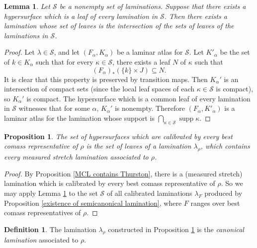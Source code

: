 \documentclass[reqno,11pt]{amsart}
\DeclareMathOperator{\supp}{supp}
\newcommand{\dfn}[1]{\emph{#1}\index{#1}}
\newtheorem{lemma}[theorem]{Lemma}
\newtheorem{proposition}[theorem]{Proposition}
\theoremstyle{definition}
\newtheorem{definition}[theorem]{Definition}
\numberwithin{equation}{section}
\begin{document}
\begin{lemma}\label{existence of intersections}
Let $\mathscr S$ be a nonempty set of laminations.
Suppose that there exists a hypersurface which is a leaf of every lamination in $\mathscr S$.
Then there exists a lamination whose set of leaves is the intersection of the sets of leaves of the laminations in $\mathscr S$.
\end{lemma}
\begin{proof}
Let $\lambda \in \mathscr S$, and let $(F_\alpha, K_\alpha)$ be a laminar atlas for $\mathscr S$.
Let $K'_\alpha$ be the set of $k \in K_\alpha$ such that for every $\kappa \in \mathscr S$, there exists a leaf $N$ of $\kappa$ such that
$$(F_\alpha)_*(\{k\} \times J) \subseteq N.$$
It is clear that this property is preserved by transition maps.
Then $K_\alpha'$ is an intersection of compact sets (since the local leaf spaces of each $\kappa \in \mathscr S$ is compact), so $K_\alpha'$ is compact.
The hypersurface which is a common leaf of every lamination in $\mathscr S$ witnesses that for some $\alpha$, $K_\alpha'$ is nonempty.
Therefore $(F_\alpha, K'_\alpha)$ is a laminar atlas for the lamination whose support is $\bigcap_{\kappa \in \mathscr S} \supp \kappa$.
\end{proof}

\begin{proposition}\label{existence of canonical lamination}
The set of hypersurfaces which are calibrated by every best comass representative of $\rho$ is the set of leaves of a lamination $\lambda_\rho$, which contains every measured stretch lamination associated to $\rho$.
\end{proposition}
\begin{proof}
By Proposition \ref{MCL contains Thurston}, there is a (measured stretch) lamination which is calibrated by every best comass representative of $\rho$.
So we may apply Lemma \ref{existence of intersections} to the set $\mathscr S$ of all calibrated laminations $\lambda_F$ produced by Proposition \ref{existence of semicanonical lamination}, where $F$ ranges over best comass representatives of $\rho$.
\end{proof}

\begin{definition}
The lamination $\lambda_\rho$ constructed in Proposition \ref{existence of canonical lamination} is the \dfn{canonical lamination} associated to $\rho$.
\end{definition}


\end{document}

